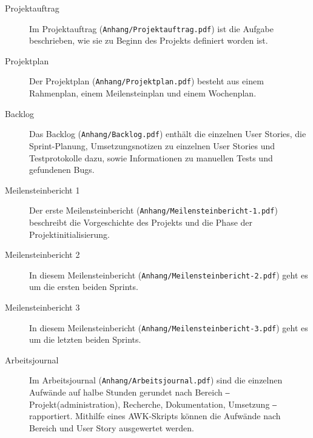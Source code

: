 \begin{description}
    \item[Projektauftrag] Im Projektauftrag (\texttt{Anhang/Projektauftrag.pdf}) ist die Aufgabe beschrieben, wie sie zu Beginn des Projekts definiert worden ist.
    \item[Projektplan] Der Projektplan (\texttt{Anhang/Projektplan.pdf}) besteht aus einem Rahmenplan, einem Meilensteinplan und einem Wochenplan.
    \item[Backlog] Das Backlog (\texttt{Anhang/Backlog.pdf}) enthält die einzelnen User Stories, die Sprint-Planung, Umsetzungsnotizen zu einzelnen User Stories und Testprotokolle dazu, sowie Informationen zu manuellen Tests und gefundenen Bugs.
    \item[Meilensteinbericht 1] Der erste Meilensteinbericht (\texttt{Anhang/Meilensteinbericht-1.pdf}) beschreibt die Vorgeschichte des Projekts und die Phase der Projektinitialisierung.
    \item[Meilensteinbericht 2] In diesem Meilensteinbericht (\texttt{Anhang/Meilensteinbericht-2.pdf}) geht es um die ersten beiden Sprints.
    \item[Meilensteinbericht 3] In diesem Meilensteinbericht (\texttt{Anhang/Meilensteinbericht-3.pdf}) geht es um die letzten beiden Sprints.
    \item[Arbeitsjournal] Im Arbeitsjournal (\texttt{Anhang/Arbeitsjournal.pdf}) sind die einzelnen Aufwände auf halbe Stunden gerundet nach Bereich ‒ Projekt(administration), Recherche, Dokumentation, Umsetzung ‒ rapportiert. Mithilfe eines AWK-Skripts können die Aufwände nach Bereich und User Story ausgewertet werden.
\end{description}
